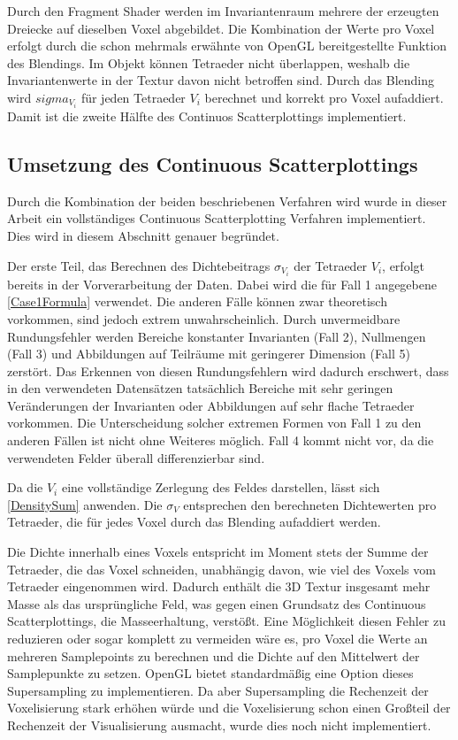 \documentclass[a4paper,fontsize=12pt,toc=bib,halfparskip,ngerman]{scrartcl}
\begin{document}
Durch den Fragment Shader werden im Invariantenraum mehrere der erzeugten Dreiecke auf dieselben Voxel abgebildet. Die Kombination der Werte pro Voxel erfolgt durch die schon mehrmals erw\"ahnte von OpenGL bereitgestellte Funktion des Blendings. Im Objekt k\"onnen Tetraeder nicht \"uberlappen, weshalb die Invariantenwerte in der Textur davon nicht betroffen sind. Durch das Blending wird $sigma_{V_i}$ f\"ur jeden Tetraeder $V_i$ berechnet und korrekt pro Voxel aufaddiert. Damit ist die zweite H\"alfte des Continuos Scatterplottings implementiert.

\subsection{Umsetzung des Continuous Scatterplottings}
\label{CSPImplementation}
Durch die Kombination der beiden beschriebenen Verfahren wird wurde in dieser Arbeit ein vollst\"andiges Continuous Scatterplotting Verfahren implementiert. Dies wird in diesem Abschnitt genauer begr\"undet.

Der erste Teil, das Berechnen des Dichtebeitrags $\sigma_{V_i}$ der Tetraeder $V_i$, erfolgt bereits in der Vorverarbeitung der Daten. Dabei wird die f\"ur Fall 1 angegebene \cref{Case1Formula} verwendet. Die anderen F\"alle k\"onnen zwar theoretisch vorkommen, sind jedoch extrem unwahrscheinlich. Durch unvermeidbare Rundungsfehler werden Bereiche konstanter Invarianten (Fall 2), Nullmengen (Fall 3) und Abbildungen auf Teilr\"aume mit geringerer Dimension (Fall 5) zerst\"ort. Das Erkennen von diesen Rundungsfehlern wird dadurch erschwert, dass in den verwendeten Datens\"atzen tats\"achlich Bereiche mit sehr geringen Ver\"anderungen der Invarianten oder Abbildungen auf sehr flache Tetraeder vorkommen. Die Unterscheidung solcher extremen Formen von Fall 1 zu den anderen F\"allen ist nicht ohne Weiteres m\"oglich. Fall 4 kommt nicht vor, da die verwendeten Felder \"uberall differenzierbar sind.

Da die $V_i$ eine vollst\"andige Zerlegung des Feldes darstellen, l\"asst sich \cref{DensitySum} anwenden. Die $\sigma_V$ entsprechen den berechneten Dichtewerten pro Tetraeder, die f\"ur jedes Voxel durch das Blending aufaddiert werden.

Die Dichte innerhalb eines Voxels entspricht im Moment stets der Summe der Tetraeder, die das Voxel schneiden, unabh\"angig davon, wie viel des Voxels vom Tetraeder eingenommen wird. Dadurch enth\"alt die 3D Textur insgesamt mehr Masse als das urspr\"ungliche Feld, was gegen einen Grundsatz des Continuous Scatterplottings, die Masseerhaltung, verst\"o{\ss}t. Eine M\"oglichkeit diesen Fehler zu reduzieren oder sogar komplett zu vermeiden w\"are es, pro Voxel die Werte an mehreren Samplepoints zu berechnen und die Dichte auf den Mittelwert der Samplepunkte zu setzen. OpenGL bietet standardm\"a{\ss}ig eine Option dieses Supersampling zu implementieren. Da aber Supersampling die Rechenzeit der Voxelisierung stark erh\"ohen w\"urde und die Voxelisierung schon einen Gro{\ss}teil der Rechenzeit der Visualisierung ausmacht, wurde dies noch nicht implementiert.
\end{document}
